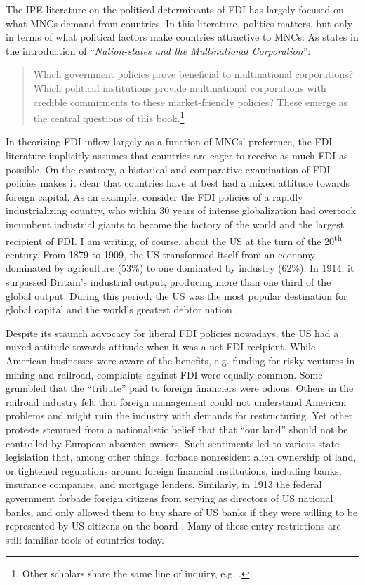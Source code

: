 The IPE literature on the political determinants of FDI has largely focused on
what MNCs demand from countries. In this literature, politics matters, but only
in terms of what political factors make countries attractive to MNCs. As
\citet{Jensen2008b} states in the introduction of ``\textit{Nation-states and the
  Multinational Corporation}'':

\begin{quote}
  Which government policies prove beneficial to multinational corporations?
  Which political institutions provide multinational corporations with credible
  commitments to these market-friendly policies? These emerge as the central
  questions of this book.\footnote{Other scholars share the same line of
    inquiry, e.g.
  \citet{Ahlquist2006, Busse2007, Buthe2008, Li2003}.}
\end{quote}

In theorizing FDI inflow largely as a function of MNCs' preference, the FDI
literature implicitly assumes that countries are eager to receive as much FDI as
possible. On the contrary, a historical and comparative examination of FDI
policies makes it clear that countries have at best had a mixed attitude towards
foreign capital. As an example, consider the FDI policies of a rapidly
industrializing country, who within 30 years of intense globalization had
overtook incumbent industrial giants to become the factory of the world and the
largest recipient of FDI. I am writing, of course, about the US at the turn of
the 20\textsuperscript{th} century. From 1879 to 1909, the US transformed itself
from an economy dominated by agriculture (53\%) to one dominated by industry
(62\%). In 1914, it surpassed Britain's industrial output, producing more than
one third of the global output. During this period, the US was the most
popular destination for global capital and the world's greatest debtor nation
\citep[part II]{Wilkins1989}.

Despite its staunch advocacy for liberal FDI policies nowadays, the US had a
mixed attitude towards attitude when it was a net FDI recipient. While American
businesses were aware of the benefits, e.g. funding for risky ventures in mining
and railroad, complaints against FDI were equally common. Some grumbled that the
``tribute'' paid to foreign financiers were odious. Others in the railroad
industry felt that foreign management could not understand American problems and
might ruin the industry with demands for restructuring. Yet other protests
stemmed from a nationalistic belief that that ``our land'' should not be
controlled by European absentee owners. Such sentiments led to various state
legislation that, among other things, forbade nonresident alien ownership of
land, or tightened regulations around foreign financial institutions, including
banks, insurance companies, and mortgage lenders. Similarly, in 1913 the federal
government forbade foreign citizens from serving as directors of US national
banks, and only allowed them to buy share of US banks if they were willing to be
represented by US citizens on the board \citep[part II]{Wilkins1989}. Many of
these entry restrictions are still familiar tools of countries today.

